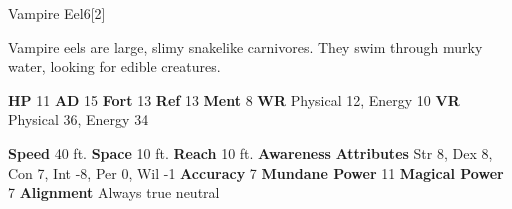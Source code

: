   \begin{monsection}{Vampire Eel}{6}[2]
    \vspace{-1em}\vspace{-1em}
    \vspace{0em}

    
      Vampire eels are large, slimy snakelike carnivores.
      They swim through murky water, looking for edible creatures.
    
    

    \begin{spellcontent}
      \begin{spelltargetinginfo}
        \pari \textbf{HP} 11 \monsep
          \textbf{AD} 15 \monsep
          \textbf{Fort} 13 \monsep
          \textbf{Ref} 13 \monsep
          \textbf{Ment} 8
        \pari \textbf{WR} Physical 12, Energy 10 \monsep
        \textbf{VR} Physical 36, Energy 34
        
      \end{spelltargetinginfo}
    \end{spellcontent}
    \begin{monsterfooter}
      \pari \textbf{Speed} 40 ft. \monsep
        \textbf{Space} 10 ft. \monsep
        \textbf{Reach} 10 ft.
      \pari \textbf{Awareness} 
      \pari \textbf{Attributes}
        Str 8, Dex 8,
        Con 7, Int -8,
        Per 0, Wil -1
      \pari \textbf{Accuracy} 7 \monsep
        \textbf{Mundane Power} 11 \monsep
      \textbf{Magical Power} 7
      \pari \textbf{Alignment} Always true neutral
    \end{monsterfooter}
  \end{monsection}
  
